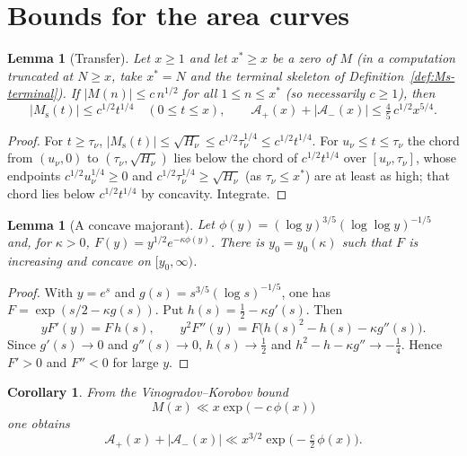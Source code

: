 \documentclass[11pt]{amsart}
\numberwithin{equation}{section}
\theoremstyle{plain}
\newtheorem{lemma}[theorem]{Lemma}
\newtheorem{corollary}[theorem]{Corollary}
\theoremstyle{definition}
\theoremstyle{remark}
\newcommand{\Ms}{M_{\mathrm{s}}}
\newcommand{\Ap}{\mathcal{A}_{+}}
\newcommand{\Am}{\mathcal{A}_{-}}
\begin{document}
\section{Bounds for the area curves}
\label{sec:bounds}

\begin{lemma}[Transfer]
\label{lem:transfer}
Let $x\ge1$ and let $x^*\ge x$ be a zero of $M$ (in a computation truncated
at $N\ge x$, take $x^*=N$ and the terminal skeleton of
Definition~\ref{def:Ms-terminal}). If $|M(n)|\le c\,n^{1/2}$ for all
$1\le n\le x^*$ (so necessarily $c\ge1$), then
\begin{equation}
\label{eq:transfer_bound}
  |\Ms(t)|\le c^{1/2}t^{1/4}\quad(0\le t\le x),\qquad
  \Ap(x)+|\Am(x)|\le\tfrac45\,c^{1/2}x^{5/4}.
\end{equation}
\end{lemma}

\begin{proof}
For $t\ge\tau_\nu$, $|\Ms(t)|\le\sqrt{H_\nu}\le c^{1/2}\tau_\nu^{1/4}\le
c^{1/2}t^{1/4}$. For $u_\nu\le t\le\tau_\nu$ the chord from $(u_\nu,0)$ to
$(\tau_\nu,\sqrt{H_\nu})$ lies below the chord of $c^{1/2}t^{1/4}$ over
$[u_\nu,\tau_\nu]$, whose endpoints $c^{1/2}u_\nu^{1/4}\ge0$ and
$c^{1/2}\tau_\nu^{1/4}\ge\sqrt{H_\nu}$ (as $\tau_\nu\le x^*$) are at
least as high; that chord lies below $c^{1/2}t^{1/4}$ by concavity.
Integrate.
\end{proof}

\begin{lemma}[A concave majorant]
\label{lem:concave-majorant}
Let $\phi(y)=(\log y)^{3/5}(\log\log y)^{-1/5}$ and, for $\kappa>0$,
$F(y)=y^{1/2}e^{-\kappa\phi(y)}$. There is $y_0=y_0(\kappa)$ such that $F$
is increasing and concave on $[y_0,\infty)$.
\end{lemma}

\begin{proof}
With $y=e^s$ and $g(s)=s^{3/5}(\log s)^{-1/5}$, one has
$F=\exp(s/2-\kappa g(s))$. Put $h(s)=\frac12-\kappa g'(s)$. Then
\[
yF'(y)=F\,h(s),\qquad
y^2F''(y)=F\bigl(h(s)^2-h(s)-\kappa g''(s)\bigr).
\]
Since $g'(s)\to0$ and $g''(s)\to0$, $h(s)\to\frac12$ and
$h^2-h-\kappa g''\to-\frac14$. Hence $F'>0$ and $F''<0$ for large $y$.
\end{proof}

\begin{corollary}
\label{cor:uncond}
From the Vinogradov--Korobov bound \cite{Walfisz1963}
\begin{equation}
\label{eq:VK_M}
  M(x)\ll x\exp\bigl(-c\,\phi(x)\bigr)
\end{equation}
one obtains
\begin{equation}
\label{eq:uncond_area}
  \Ap(x)+|\Am(x)|\ll x^{3/2}\exp\bigl(-\tfrac c2\,\phi(x)\bigr).
\end{equation}
\end{corollary}
\end{document}
